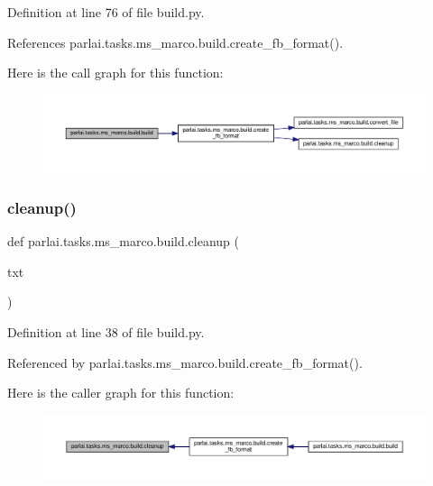 Definition at line 76 of file build.\+py.



References parlai.\+tasks.\+ms\+\_\+marco.\+build.\+create\+\_\+fb\+\_\+format().

Here is the call graph for this function\+:
\nopagebreak
\begin{figure}[H]
\begin{center}
\leavevmode
\includegraphics[width=350pt]{namespaceparlai_1_1tasks_1_1ms__marco_1_1build_a3516057a3812247cdb1b1c9e8f6cb84d_cgraph}
\end{center}
\end{figure}
\mbox{\label{namespaceparlai_1_1tasks_1_1ms__marco_1_1build_a6c94ade2f99fa70bf4103a22a1fbdc42}} 
\subsubsection{\texorpdfstring{cleanup()}{cleanup()}}
{\footnotesize\ttfamily def parlai.\+tasks.\+ms\+\_\+marco.\+build.\+cleanup (\begin{DoxyParamCaption}\item[{}]{txt }\end{DoxyParamCaption})}



Definition at line 38 of file build.\+py.



Referenced by parlai.\+tasks.\+ms\+\_\+marco.\+build.\+create\+\_\+fb\+\_\+format().

Here is the caller graph for this function\+:
\nopagebreak
\begin{figure}[H]
\begin{center}
\leavevmode
\includegraphics[width=350pt]{namespaceparlai_1_1tasks_1_1ms__marco_1_1build_a6c94ade2f99fa70bf4103a22a1fbdc42_icgraph}
\end{center}
\end{figure}
\mbox{\label{namespaceparlai_1_1tasks_1_1ms__marco_1_1build_ac19db5d0ad4ba8559f6aca64f2fe192b}} 
